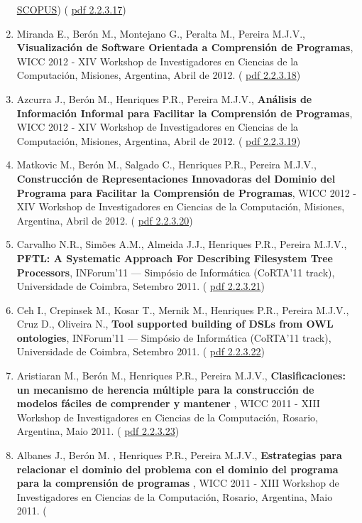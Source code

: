 \documentclass[11pt]{article}
\begin{document}
\begin{enumerate}
{\href{run:Publicacoes/PublicacoesSCOPUS.pdf}{SCOPUS}) (
\href{run:Publicacoes/publicacoes/66.pdf}{pdf 2.2.3.17})}
\item{Miranda E., Berón M., Montejano G., Peralta M., Pereira M.J.V., {
\bf{ Visualización de Software Orientada a Comprensión de Programas}}, WICC 2012 - XIV Workshop de Investigadores en Ciencias de la Computación, Misiones, Argentina, Abril de 2012. (
\href{run:Publicacoes/publicacoes/67.pdf}{pdf 2.2.3.18})}
\item{Azcurra J., Berón M., Henriques P.R., Pereira M.J.V., {
\bf{ Análisis de Información Informal para Facilitar la Comprensión de Programas}}, WICC 2012 - XIV Workshop de Investigadores en Ciencias de la Computación, Misiones, Argentina, Abril de 2012. (
\href{run:Publicacoes/publicacoes/65.pdf}{pdf 2.2.3.19})}
\item{Matkovic M., Berón M., Salgado C., Henriques P.R., Pereira M.J.V., {
\bf{ Construcción de Representaciones Innovadoras del Dominio del Programa para Facilitar la Comprensión de Programas}}, WICC 2012 - XIV Workshop de Investigadores en Ciencias de la Computación, Misiones, Argentina, Abril de 2012. (
\href{run:Publicacoes/publicacoes/70.pdf}{pdf 2.2.3.20})}
\item{Carvalho N.R., Simões A.M., Almeida J.J., Henriques P.R., Pereira M.J.V., {
\bf{ PFTL: A Systematic Approach For Describing Filesystem Tree Processors}}, INForum'11 --- Simpósio de Informática (CoRTA'11 track), Universidade de Coimbra, Setembro 2011. (
\href{run:Publicacoes/publicacoes/56.pdf}{pdf 2.2.3.21})}
\item{Ceh I., Crepinsek M., Kosar T., Mernik M., Henriques P.R., Pereira M.J.V., Cruz D., Oliveira N.,{
\bf{ Tool supported building of {DSL}}s from {OWL} ontologies}, INForum'11 --- Simpósio de Informática (CoRTA'11 track), Universidade de Coimbra, Setembro 2011. (
\href{run:Publicacoes/publicacoes/59.pdf}{pdf 2.2.3.22})}
\item{Aristiaran M.,  Berón M., Henriques P.R., Pereira M.J.V., {
\bf{ Clasificaciones: un mecanismo de herencia múltiple para la construcción de modelos fáciles de comprender y mantener}} , WICC 2011 - XIII Workshop de Investigadores en Ciencias de la Computación, Rosario, Argentina, Maio 2011. (
\href{run:Publicacoes/publicacoes/60.pdf}{pdf 2.2.3.23})}
\item{Albanes J.,  Berón M. , Henriques P.R., Pereira M.J.V., {
\bf{ Estrategias para relacionar el dominio del problema con el dominio del programa para la comprensión de programas}} , WICC 2011 - XIII Workshop de Investigadores en Ciencias de la Computación, Rosario, Argentina, Maio 2011. (
}
\end{enumerate}
\end{document}
